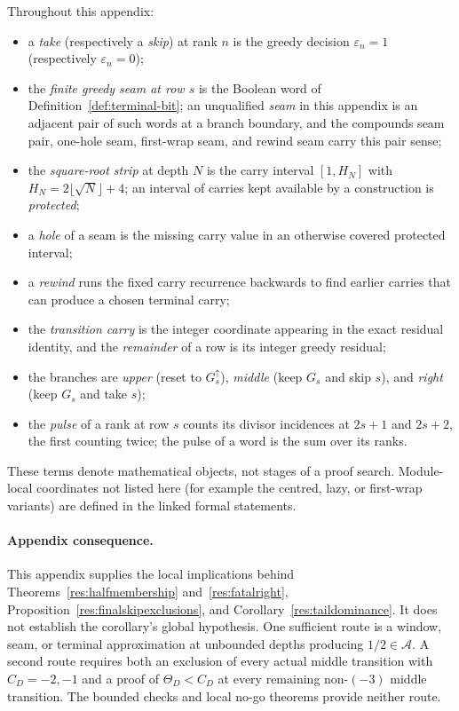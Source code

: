 \documentclass[11pt]{article}
\theoremstyle{definition}
\theoremstyle{remark}
\begin{document}
Throughout this appendix:
\begin{itemize}[leftmargin=1.6em]
\item a \emph{take} (respectively a \emph{skip}) at rank \(n\) is the
greedy decision \(\varepsilon_n=1\) (respectively \(\varepsilon_n=0\));
\item the \emph{finite greedy seam at row \(s\)} is the Boolean word of
Definition~\ref{def:terminal-bit}; an unqualified \emph{seam} in this
appendix is an adjacent pair of such words at a branch boundary, and the
compounds seam pair, one-hole seam, first-wrap seam, and rewind seam carry
this pair sense;
\item the \emph{square-root strip} at depth \(N\) is the carry interval
\([1,H_N]\) with \(H_N=2\lfloor\sqrt N\rfloor+4\); an interval of carries
kept available by a construction is \emph{protected};
\item a \emph{hole} of a seam is the missing carry value in an otherwise
covered protected interval;
\item a \emph{rewind} runs the fixed carry recurrence backwards to find
earlier carries that can produce a chosen terminal carry;
\item the \emph{transition carry} is the integer coordinate appearing in
the exact residual identity, and the \emph{remainder} of a row is its
integer greedy residual;
\item the branches are \emph{upper} (reset to $G_s^\uparrow$), \emph{middle} (keep
$G_s$ and skip $s$), and \emph{right} (keep $G_s$ and take $s$);
\item the \emph{pulse} of a rank at row \(s\) counts its divisor
incidences at \(2s+1\) and \(2s+2\), the first counting twice; the pulse
of a word is the sum over its ranks.
\end{itemize}
These terms denote mathematical objects, not stages of a proof search.
Module-local coordinates not listed here (for example the centred, lazy,
or first-wrap variants) are defined in the linked formal statements.

\HalfValueTechnicalAppendix

\paragraph{Appendix consequence.}
This appendix supplies the local implications behind
Theorems~\ref{res:halfmembership} and~\ref{res:fatalright},
Proposition~\ref{res:finalskipexclusions}, and
Corollary~\ref{res:taildominance}.  It does not establish the corollary's
global hypothesis.  One sufficient route is a window, seam, or terminal
approximation at unbounded depths producing \(1/2\in\mathcal A\).  A second route
requires both an exclusion of every actual middle transition with
\(C_D=-2,-1\) and a proof of \(\Theta_D<C_D\) at every remaining
non-\((-3)\) middle transition.  The
bounded checks and local no-go theorems provide neither route.
\end{document}
